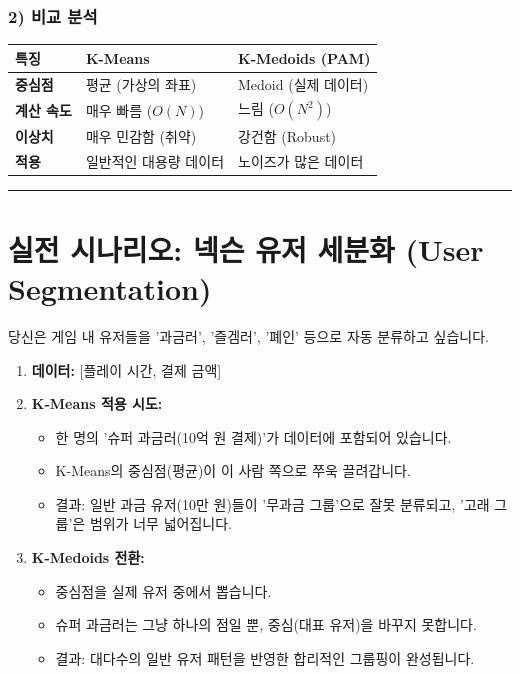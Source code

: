 \documentclass[11pt,a4paper]{book}
\theoremstyle{definition}
\begin{document}
\subsubsection*{2) 비교 분석}
\begin{table}[h]
\centering
\begin{tabular}{l|l|l}
\toprule
\textbf{특징} & \textbf{K-Means} & \textbf{K-Medoids (PAM)} \\
\midrule
\textbf{중심점} & 평균 (가상의 좌표) & Medoid (실제 데이터) \\
\textbf{계산 속도} & 매우 빠름 ($O(N)$) & 느림 ($O(N^2)$) \\
\textbf{이상치} & 매우 민감함 (취약) & 강건함 (Robust) \\
\textbf{적용} & 일반적인 대용량 데이터 & 노이즈가 많은 데이터 \\
\bottomrule
\end{tabular}
\end{table}

\vspace{0.5cm}\hrule\vspace{0.5cm}

\section{실전 시나리오: 넥슨 유저 세분화 (User Segmentation)}

\begin{storybox}[title={Scenario: 고래(Whale) 유저와 일반 유저 분류}]
당신은 게임 내 유저들을 '과금러', '즐겜러', '폐인' 등으로 자동 분류하고 싶습니다.
\end{storybox}

\begin{enumerate}
    \item \textbf{데이터:} [플레이 시간, 결제 금액]
    \item \textbf{K-Means 적용 시도:}
    \begin{itemize}
        \item 한 명의 '슈퍼 과금러(10억 원 결제)'가 데이터에 포함되어 있습니다.
        \item K-Means의 중심점(평균)이 이 사람 쪽으로 쭈욱 끌려갑니다.
        \item 결과: 일반 과금 유저(10만 원)들이 '무과금 그룹'으로 잘못 분류되고, '고래 그룹'은 범위가 너무 넓어집니다.
    \end{itemize}
    \item \textbf{K-Medoids 전환:}
    \begin{itemize}
        \item 중심점을 실제 유저 중에서 뽑습니다.
        \item 슈퍼 과금러는 그냥 하나의 점일 뿐, 중심(대표 유저)을 바꾸지 못합니다.
        \item 결과: 대다수의 일반 유저 패턴을 반영한 합리적인 그룹핑이 완성됩니다.
    \end{itemize}
\end{enumerate}
\end{document}
